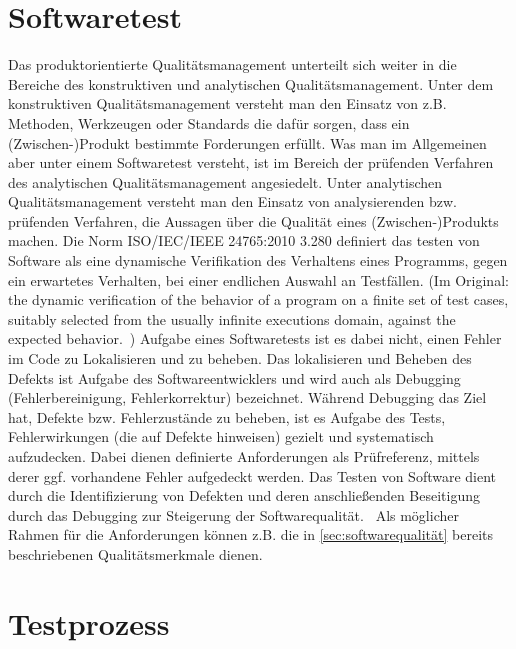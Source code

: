 \section{Softwaretest}
\label{sec:softwaretest}

Das produktorientierte Qualitätsmanagement unterteilt sich weiter in die Bereiche des konstruktiven und analytischen Qualitätsmanagement.
Unter dem konstruktiven Qualitätsmanagement versteht man den Einsatz von z.B. Methoden, Werkzeugen oder Standards die dafür sorgen, dass ein (Zwischen-)Produkt bestimmte Forderungen erfüllt.
Was man im Allgemeinen aber unter einem Softwaretest versteht, ist im Bereich der prüfenden Verfahren des analytischen Qualitätsmanagement angesiedelt.
Unter analytischen Qualitätsmanagement versteht man den Einsatz von analysierenden bzw. prüfenden Verfahren, die Aussagen über die Qualität eines (Zwischen-)Produkts machen. \cite{prof._dr._r._lindermeier_projekt-_2006} \newline
Die Norm ISO/IEC/IEEE 24765:2010 3.280 definiert das testen von Software als eine dynamische Verifikation des Verhaltens eines Programms, gegen ein erwartetes Verhalten, bei einer endlichen Auswahl an Testfällen. (Im Original: \glqq the dynamic verification of the behavior of a program on a finite set of test cases, suitably selected from the usually infinite executions domain, against the expected behavior.\grqq\ \cite{iso/iec/ieee_systems_2010})
Aufgabe eines Softwaretests ist es dabei nicht, einen Fehler im Code zu Lokalisieren und zu beheben.
Das lokalisieren und Beheben des Defekts ist Aufgabe des Softwareentwicklers und wird auch als Debugging (Fehlerbereinigung, Fehlerkorrektur) bezeichnet.
Während Debugging das Ziel hat, Defekte bzw. Fehlerzustände zu beheben, ist es Aufgabe des Tests, Fehlerwirkungen (die auf Defekte hinweisen) gezielt und systematisch aufzudecken. \cite{spillner_basiswissen_2007}
Dabei dienen definierte Anforderungen als Prüfreferenz, mittels derer ggf. vorhandene Fehler aufgedeckt werden.
\glqq Das Testen von Software dient durch die Identifizierung von Defekten und deren anschließenden Beseitigung durch das Debugging zur Steigerung der Softwarequalität.\grqq\ \cite{spillner_basiswissen_2007}
Als möglicher Rahmen für die Anforderungen können z.B. die in \ref{sec:softwarequalität} bereits beschriebenen Qualitätsmerkmale dienen.


\section{Testprozess}
\label{sec:testprozess}

